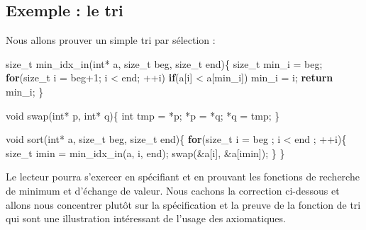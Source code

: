 \documentclass[12pt,francais,]{scrbook}
\newenvironment{Shaded}{}{}
\newcommand{\KeywordTok}[1]{\textcolor[rgb]{0.00,0.44,0.13}{\textbf{{#1}}}}
\newcommand{\DataTypeTok}[1]{\textcolor[rgb]{0.56,0.13,0.00}{{#1}}}
\newcommand{\DecValTok}[1]{\textcolor[rgb]{0.25,0.63,0.44}{{#1}}}
\newcommand{\NormalTok}[1]{{#1}}
\begin{document}
\subsection{Exemple : le tri}\label{exemple-le-tri}

Nous allons prouver un simple tri par sélection :

\begin{footnotesize}\begin{Shaded}
\begin{Highlighting}[]
\NormalTok{size_t min_idx_in(}\DataTypeTok{int}\NormalTok{* a, size_t beg, size_t end)\{}
  \NormalTok{size_t min_i = beg;}
  \KeywordTok{for}\NormalTok{(size_t i = beg}\DecValTok{+1}\NormalTok{; i < end; ++i)}
    \KeywordTok{if}\NormalTok{(a[i] < a[min_i]) min_i = i;}
  \KeywordTok{return} \NormalTok{min_i;}
\NormalTok{\}}

\DataTypeTok{void} \NormalTok{swap(}\DataTypeTok{int}\NormalTok{* p, }\DataTypeTok{int}\NormalTok{* q)\{}
  \DataTypeTok{int} \NormalTok{tmp = *p; *p = *q; *q = tmp;}
\NormalTok{\}}

\DataTypeTok{void} \NormalTok{sort(}\DataTypeTok{int}\NormalTok{* a, size_t beg, size_t end)\{}
  \KeywordTok{for}\NormalTok{(size_t i = beg ; i < end ; ++i)\{}
    \NormalTok{size_t imin = min_idx_in(a, i, end);}
    \NormalTok{swap(&a[i], &a[imin]);}
  \NormalTok{\}}
\NormalTok{\}}
\end{Highlighting}
\end{Shaded}\end{footnotesize}

Le lecteur pourra s'exercer en spécifiant et en prouvant les fonctions
de recherche de minimum et d'échange de valeur. Nous cachons la
correction ci-dessous et allons nous concentrer plutôt sur la
spécification et la preuve de la fonction de tri qui sont une
illustration intéressant de l'usage des axiomatiques.
\end{document}
